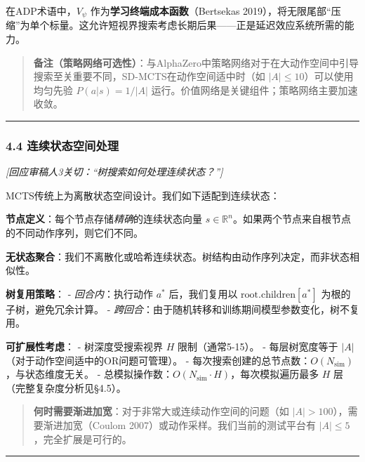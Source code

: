 \documentclass[UTF8]{ctexart}
\begin{document}
在ADP术语中，\(V_\psi\) 作为\textbf{学习终端成本函数}（Bertsekas
2019），将无限尾部``压缩''为单个标量。这允许短视界搜索考虑长期后果------正是延迟效应系统所需的能力。

\begin{quote}
\textbf{备注（策略网络可选性）}：与AlphaZero中策略网络对于在大动作空间中引导搜索至关重要不同，SD-MCTS在动作空间适中时（如
\(\lvert A\rvert \leq 10\)）可以使用均匀先验
\(P(a\lvert s) = 1/\lvert A\rvert\)
运行。价值网络是关键组件；策略网络主要加速收敛。
\end{quote}

\begin{center}\rule{0.5\linewidth}{0.4pt}\end{center}

\hypertarget{ux8fdeux7eedux72b6ux6001ux7a7aux95f4ux5904ux7406}{%
\subsubsection{4.4
连续状态空间处理}\label{ux8fdeux7eedux72b6ux6001ux7a7aux95f4ux5904ux7406}}

\emph{{[}回应审稿人3关切：``树搜索如何处理连续状态？''{]}}

MCTS传统上为离散状态空间设计。我们如下适配到连续状态：

\textbf{节点定义}：每个节点存储\emph{精确}的连续状态向量
\(s \in \mathbb{R}^n\)。如果两个节点来自根节点的不同动作序列，则它们不同。

\textbf{无状态聚合}：我们不离散化或哈希连续状态。树结构由动作序列决定，而非状态相似性。

\textbf{树复用策略}： - \emph{回合内}：执行动作 \(a^*\) 后，我们复用以
\(\text{root.children}[a^*]\) 为根的子树，避免冗余计算。 -
\emph{跨回合}：由于随机转移和训练期间模型参数变化，树不复用。

\textbf{可扩展性考虑}： - 树深度受搜索视界 \(H\) 限制（通常5-15）。 -
每层树宽度等于 \(|A|\)（对于动作空间适中的OR问题可管理）。 -
每次搜索创建的总节点数：\(O(N_{\text{sim}})\)，与状态维度无关。 -
总模拟操作数：\(O(N_{\text{sim}} \cdot H)\)，每次模拟遍历最多 \(H\)
层（完整复杂度分析见§4.5）。

\begin{quote}
\textbf{何时需要渐进加宽}：对于非常大或连续动作空间的问题（如
\(\lvert A\rvert > 100\)），需要渐进加宽（Coulom
2007）或动作采样。我们当前的测试平台有
\(\lvert A\rvert \leq 5\)，完全扩展是可行的。
\end{quote}

\begin{center}\rule{0.5\linewidth}{0.4pt}\end{center}
\end{document}
